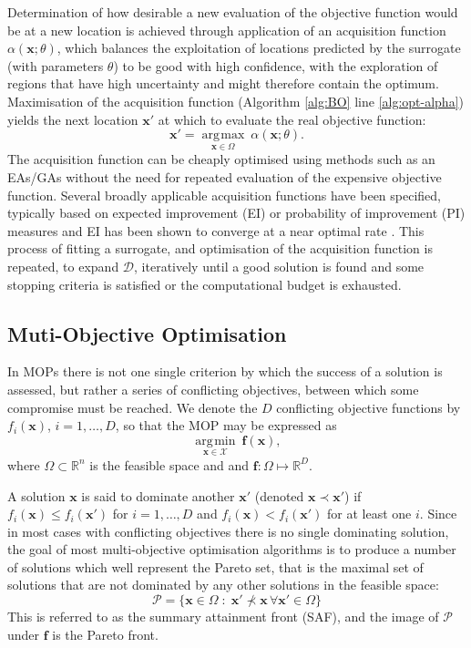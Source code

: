 \documentclass[runningheads]{llncs}
\newcommand\mP{\mathcal{P}}
\newcommand\mX{\mathcal{X}}
\DeclareMathOperator*{\argmax}{\arg\!\max}
\DeclareMathOperator*{\argmin}{\arg\!\min}
\newcommand{\bx}{\mathbf{x}}
\newcommand{\bff}{\mathbf{f}}
\begin{document}
Determination of how desirable a new evaluation of the objective function
would be at a new location is achieved through application of an acquisition function $\alpha(\mathbf{x};  \theta)$, which balances the exploitation of locations predicted by the surrogate (with parameters $\theta$) to be good with high confidence, with the exploration of regions that have high uncertainty and might therefore contain the optimum. Maximisation of the acquisition function (Algorithm \ref{alg:BO} line \ref{alg:opt-alpha}) yields the next location $\bx'$ at which to evaluate the real objective function: 
\begin{equation}\label{eqn: argmax_alpha}
   \bx' = \underset{\mathbf{x} \in \Omega}{\argmax}\:\alpha(\mathbf{x};  \theta).
\end{equation}
The acquisition function can be cheaply optimised using methods such as an EAs/GAs without the need for repeated evaluation of the expensive objective function. Several broadly applicable acquisition functions have been specified, typically based on expected improvement (EI) or probability of improvement (PI) measures \cite{jones1998efficient,shahriari2015taking} and EI has been shown to converge at a near optimal rate \cite{bull2011convergence}. This process of fitting a surrogate, and optimisation of the acquisition function is repeated,  to expand $\mathcal{D}$, iteratively until a good solution is found and some stopping criteria is satisfied or the computational budget is exhausted.

\subsection{Muti-Objective Optimisation}\label{section:background_MOPs}
In MOPs there is not one single criterion by which the success of a solution is assessed, but rather a series of conflicting objectives, between which some compromise must be reached. We denote the $D$ conflicting objective functions by $f_i(\bx)$, $i = 1, \ldots, D$, so that the MOP may be expressed 
as 
\begin{equation}\label{eqn: min_F}
\underset{\mathbf{x} \in \mX}{\argmin}\:\mathbf{f}(\mathbf{x}), 
\end{equation}
where $\Omega \subset \mathbb{R}^n$ is the feasible space and and $\mathbf{f}: \Omega \mapsto \mathbb{R}^{D}$.

A solution $\bx$ is said to dominate another $\bx'$ (denoted $\bx \prec \bx'$) if $f_i(\bx) \le f_i(\bx')$ for $i = 1, \ldots, D$ and $ f_i(\bx) < f_i(\bx')$ for at least one $i$. Since in most cases with conflicting objectives there is no single dominating solution, the goal of most multi-objective optimisation algorithms is to produce a number of solutions which well represent the Pareto set, that is the maximal set of solutions that are not dominated by any other solutions in the feasible space:
\begin{equation}\label{eqn: Pareto_set}
  \mathcal{P} = \{\mathbf{x} \in \Omega \;:\;
  \bx' \not\prec \bx \,\forall \bx' \in \Omega \}
\end{equation}
This is referred to as the summary attainment front (SAF), and the image of $\mP$ under $\bff$ is the Pareto front.
\end{document}
